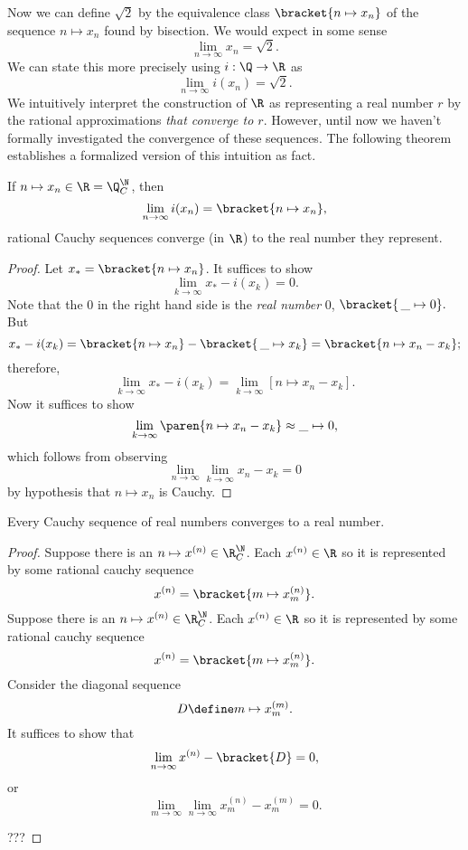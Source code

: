 \documentclass{scrartcl}
\begin{document}
Now we can define \(\sqrt 2\) by the equivalence class \(\bracket{n\mapsto x_{n}}\) of the sequence \(n\mapsto x_{n}\) found by bisection. We would expect in some sense
\[
  \lim_{{n\to\infty}}x_{n} = \sqrt 2.
\]
We can state this more precisely using \(i:\Q\to\R\) as
\[
  \lim_{n\to\infty}i(x_{n}) = \sqrt 2.
\]
We intuitively interpret the construction of \(\R\) as representing a real number \(r\) by the rational approximations \emph{that converge to \(r\)}. However, until now we haven't formally investigated the convergence of these sequences. The following theorem establishes a formalized version of this intuition as fact.
\begin{theorem}
  If \(n\mapsto x_{n} \in \R=\Q^{\N}_{C}\), then
  \[
    \lim_{n\to\infty} i(x_{n}) = \bracket{n\mapsto x_{n}},
  \]
  \ie{} rational Cauchy sequences converge (in \(\R\)) to the real number they represent.
\end{theorem}
\begin{proof}
  Let \(x_{*}=\bracket{n\mapsto x_{n}}\). It suffices to show
  \[
    \lim_{k\to\infty} x_{*}-i(x_{k}) = 0.
  \]
  Note that the \(0\) in the right hand side is the \emph{real number} \(0\), \ie{}
  \(
    \bracket{\,\_{}\mapsto 0}.
  \)
  But
  \[
    x_{*} - i(x_{k}) = \bracket{n \mapsto x_{n}}-\bracket{\,\_{}\mapsto x_{k}} = \bracket{n\mapsto x_{n}-x_{k}};
  \]
  therefore,
  \[
    \lim_{{k\to\infty}} x_{*}-i(x_{k}) = \lim_{k\to\infty} [n\mapsto x_{n}-x_{k}].
  \]
  Now it suffices to show
  \[
    \lim_{k\to\infty}\paren{n\mapsto x_{n} -x_{k}} \approx \_{}\mapsto0,
  \]
  which follows from observing
  \[
    \lim_{n\to\infty}\lim_{k\to\infty} x_{n}-x_{k} =0
  \]
  by hypothesis that \(n\mapsto x_{n}\) is Cauchy.
\end{proof}
\begin{theorem}
  Every Cauchy sequence of real numbers converges to a real number.
\end{theorem}
\begin{proof}
  Suppose there is an \(n\mapsto x^{(n)}\in \R^{\N}_{C}\). Each \(x^{(n)}\in \R\) so it is represented by some rational cauchy sequence
  \[
    x^{(n)} = \bracket{m\mapsto x^{(n)}_{m}}.
  \]
  Suppose there is an \(n\mapsto x^{(n)}\in \R^{\N}_{C}\). Each \(x^{(n)}\in \R\) so it is represented by some rational cauchy sequence
  \[
    x^{(n)} = \bracket{m\mapsto x^{(n)}_{m}}.
  \]
  Consider the diagonal sequence
  \[
    D\define m\mapsto x^{(m)}_{m}.
  \]
  It suffices to show that
  \[
    \lim_{n\to\infty}x^{(n)} - \bracket{D} = 0,
  \]
  or
  \[
    \lim_{m\to\infty}\lim_{n\to\infty} x^{(n)}_{m}-x^{(m)}_{m} = 0.
  \]


  ???

\end{proof}
\end{document}

